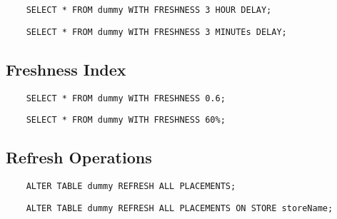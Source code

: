 \begin{verbatim}
    SELECT * FROM dummy WITH FRESHNESS 3 HOUR DELAY;
\end{verbatim}

\begin{verbatim}
    SELECT * FROM dummy WITH FRESHNESS 3 MINUTEs DELAY;
\end{verbatim}



\tocless\subsection{Freshness Index}

\begin{verbatim}
    SELECT * FROM dummy WITH FRESHNESS 0.6;
\end{verbatim}

\begin{verbatim}
    SELECT * FROM dummy WITH FRESHNESS 60%;
\end{verbatim}



\tocless\subsection{Refresh Operations}

\begin{verbatim}
    ALTER TABLE dummy REFRESH ALL PLACEMENTS;
\end{verbatim}

\begin{verbatim}
    ALTER TABLE dummy REFRESH ALL PLACEMENTS ON STORE storeName;
\end{verbatim}

